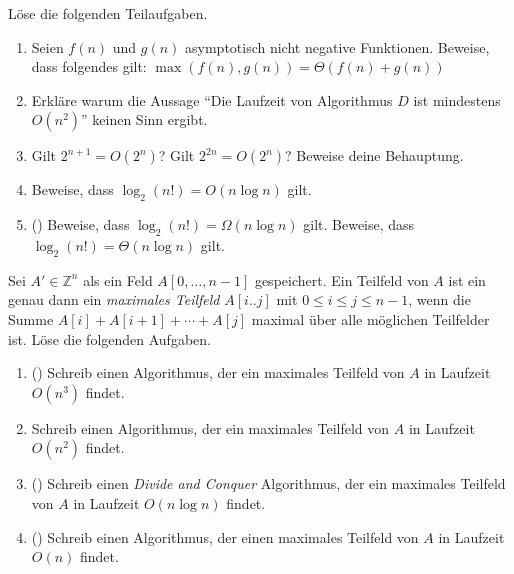 \documentclass{uebung_cs}
\begin{document}
\begin{aufgabe}
	Löse die folgenden Teilaufgaben.
	\begin{enumerate}
		\item Seien $f(n)$ und $g(n)$ asymptotisch nicht negative Funktionen.
		Beweise, dass folgendes gilt: $\max(f(n),g(n)) = \Theta(f(n) + g(n))$
		\item Erkläre warum die Aussage \enquote{Die Laufzeit von Algorithmus $D$ ist mindestens $O(n^2)$} keinen Sinn ergibt.
		\item Gilt $2^{n+1} = O(2^n)$? Gilt $2^{2n} = O(2^n)$? Beweise deine Behauptung.
		\item Beweise, dass $\log_2(n!) = O(n \log n)$ gilt.
		\item (\hard) Beweise, dass $\log_2(n!) = \Omega(n\log n)$ gilt.
		Beweise, dass $\log_2(n!) = \Theta(n\log n)$ gilt.
	\end{enumerate}
\end{aufgabe}

\begin{aufgabe}
	Sei $A' \in \mathbb{Z}^n$ als ein Feld $A[0, \dots, n-1]$ gespeichert.
	Ein Teilfeld von $A$ ist ein genau dann ein \textit{maximales Teilfeld} $A[i..j]$ mit $0\leq i\leq j\leq n-1$, wenn die Summe $A[i] + A[i+1] + \cdots + A[j]$ maximal über alle möglichen Teilfelder ist.
	Löse die folgenden Aufgaben.
	\begin{enumerate}
		\item (\warmup) Schreib einen Algorithmus, der ein maximales Teilfeld von $A$ in Laufzeit $O(n^3)$ findet.
		\item Schreib einen Algorithmus, der ein maximales Teilfeld von $A$ in Laufzeit $O(n^2)$ findet.
		\item (\hard) Schreib einen \textit{Divide and Conquer} Algorithmus, der ein maximales Teilfeld von $A$ in Laufzeit $O(n\log n)$ findet.
		\item (\veryhard) Schreib einen Algorithmus, der einen maximales Teilfeld von $A$ in Laufzeit $O(n)$ findet.
	\end{enumerate}
\end{aufgabe}
\end{document}
